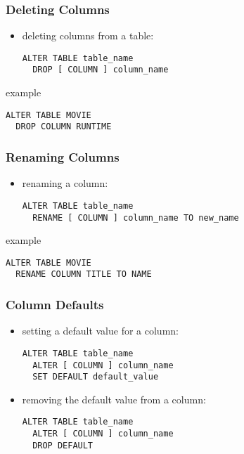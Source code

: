 \documentclass[dvipsnames]{beamer}
\theoremstyle{plain}
\begin{document}
\begin{frame}[fragile]
  \frametitle{Deleting Columns}

  \begin{itemize}
    \item deleting columns from a table:
    \begin{lstlisting}
ALTER TABLE table_name
  DROP [ COLUMN ] column_name
    \end{lstlisting}
  \end{itemize}

  \medskip
  \begin{exampleblock}{example}
    \begin{lstlisting}
ALTER TABLE MOVIE
  DROP COLUMN RUNTIME
    \end{lstlisting}
  \end{exampleblock}
\end{frame}

\begin{frame}[fragile]
  \frametitle{Renaming Columns}

  \begin{itemize}
    \item renaming a column:
    \begin{lstlisting}
ALTER TABLE table_name
  RENAME [ COLUMN ] column_name TO new_name
    \end{lstlisting}
  \end{itemize}

  \medskip
  \begin{exampleblock}{example}
    \begin{lstlisting}
ALTER TABLE MOVIE
  RENAME COLUMN TITLE TO NAME
    \end{lstlisting}
  \end{exampleblock}
\end{frame}

\begin{frame}[fragile]
  \frametitle{Column Defaults}

  \begin{itemize}
    \item setting a default value for a column:
    \begin{lstlisting}
ALTER TABLE table_name
  ALTER [ COLUMN ] column_name
  SET DEFAULT default_value
    \end{lstlisting}

    \item removing the default value from a column:
    \begin{lstlisting}
ALTER TABLE table_name
  ALTER [ COLUMN ] column_name
  DROP DEFAULT
    \end{lstlisting}
  \end{itemize}
\end{frame}
\end{document}
